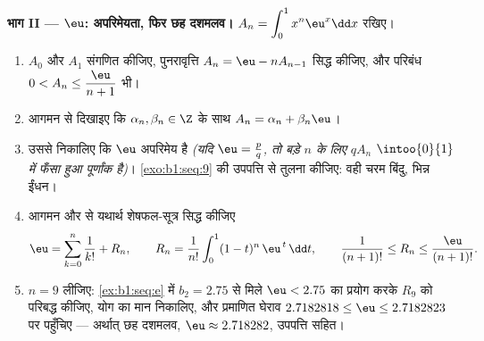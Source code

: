 \begin{problem}
\medskip \noindent\textbf{भाग II --- $\eu$: अपरिमेयता, फिर छह दशमलव।} $A_n =
\displaystyle\int_0^1 x^n \eu^x \dd x$ रखिए।
\begin{enumerate}[resume]
  \item $A_0$ और $A_1$ संगणित कीजिए, पुनरावृत्ति $A_n = \eu - n A_{n-1}$
  सिद्ध कीजिए, और परिबंध $0 < A_n \leq \dfrac{\eu}{n+1}$ भी।
  \item आगमन से दिखाइए कि $\alpha_n, \beta_n \in \Z$ के साथ $A_n = \alpha_n
  + \beta_n \eu$।
  \item उससे निकालिए कि $\eu$ अपरिमेय है \emph{(यदि $\eu = \frac pq$, तो
  बड़े $n$ के लिए $q A_n$ $\intoo{0}{1}$ में फँसा हुआ पूर्णांक है)}।
  \cref{exo:b1:seq:9} की उपपत्ति से तुलना कीजिए: वही चरम बिंदु, भिन्न ईंधन।
  \item आगमन और  से यथार्थ शेषफल-सूत्र सिद्ध कीजिए
        \[
        \eu = \sum_{k=0}^{n} \frac{1}{k!} + R_n,
        \qquad
        R_n = \frac{1}{n!}\int_0^1 (1 - t)^n\,\eu^{\,t}\,\dd t,
        \qquad
        \frac{1}{(n+1)!} \leq R_n \leq \frac{\eu}{(n+1)!} .
        \]
  \item $n = 9$ लीजिए: \cref{ex:b1:seq:e} में $b_2 = 2.75$ से मिले $\eu <
  2.75$ का प्रयोग करके $R_9$ को परिबद्ध कीजिए, योग का मान निकालिए, और
  प्रमाणित घेराव $2.7182818 \leq \eu \leq 2.7182823$ पर पहुँचिए --- अर्थात्
  छह दशमलव, $\eu \approx 2.718282$, उपपत्ति सहित।
\end{enumerate}


\end{problem}
